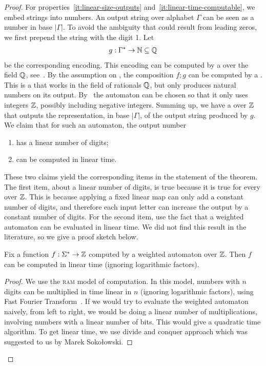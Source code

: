 \begin{proof}
    For properties~\ref{it:linear-size-outputs}
    and~\ref{it:linear-time-computable}, we embed strings into numbers. An
    output string over alphabet $\Gamma$ can be seen as a number in base
    $|\Gamma|$. To avoid the ambiguity that could result from leading zeros, we
    first prepend the string with the digit 1. Let 
    \begin{align*}
    g : \Gamma^* \to {\mathbb N} \subseteq {\mathbb Q}
    \end{align*} 
    be the corresponding encoding. This encoding can be computed by a  over the field ${\mathbb Q}$, see~\cite[Lemma 8.10]{bojanczyk_automata_2025}.
    By the assumption on , the
    composition $f;g$ can be computed by a . This is a
     that works in the field of rationals ${\mathbb Q}$, but  only
    produces natural numbers on its output. By~\cite[p.
    110]{BerstelReutenauer08} the automaton can be chosen so that it only uses
    integers ${\mathbb Z}$, possibly including negative integers. Summing up, we have
    a  over ${\mathbb Z}$ that outputs the representation, in base
    $|\Gamma|$, of the output string produced by $g$. We claim that for such an
    automaton, the output number
    \begin{enumerate}
        \item has a linear number of digits;
        \item can be computed in linear time.
    \end{enumerate}
    These two claims yield the corresponding items in the statement of the
    theorem. The first item, about a linear number of digits, is true because
    it is true for every  over ${\mathbb Z}$. This is because
    applying a fixed linear map can only add a constant number of digits, and therefore each input letter can increase the output by a constant number of digits. For the second item, use the fact that a weighted automaton can be evaluated in linear time. We did not find this result in the literature, so we give a proof sketch below.

    \begin{claim}
        Fix a function $f : \Sigma^* \to {\mathbb Z}$ computed by a weighted automaton over ${\mathbb Z}$. Then $f$ can be computed in linear time (ignoring logarithmic factors).
    \end{claim}
    \begin{proof}
        We use the \textsc{ram} model of computation.  In this model, numbers with $n$ digits can be multiplied in time linear in $n$ (ignoring logarithmic factors), using Fast Fourier Transform~\cite[p.291]{schonhage1971schnelle}. If we would try to evaluate the weighted automaton naively, from left to right, we would be doing a linear number of multiplications, involving numbers with a linear number of bits. This would give a quadratic time algorithm. To get linear time, we use  divide and conquer approach which was suggested to us by Marek Soko{\l}owski.


\end{proof}
\end{proof}
